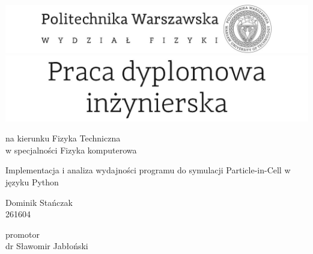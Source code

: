 

\graphicspath{{Source/LogosPW/}}


\thispagestyle{empty}
\center
\includegraphics[scale=1]{logo.jpg}
\center
\includegraphics[scale=1]{praca_dyplomowa.jpg}

\vspace{17mm}

\normalsize
na kierunku Fizyka Techniczna \\ %
w specjalności Fizyka komputerowa \\ %

\vspace{15mm}

\Large
Implementacja i analiza wydajności programu do symulacji Particle-in-Cell w języku Python\\ %

\vspace{17mm}

\huge
Dominik Stańczak  \\ %
\normalsize
261604 \\ %

\vspace{17mm}

promotor \\
dr Sławomir Jabłoński \\ %

